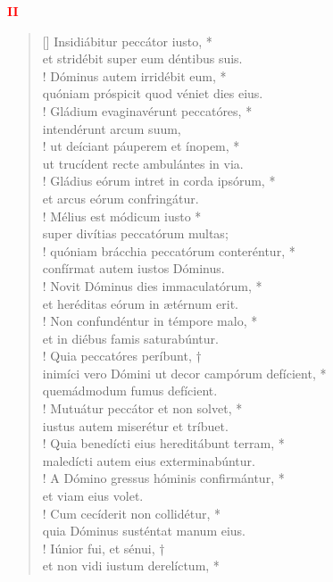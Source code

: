 \begin{center}
\textcolor{red}{\bf II}
\end{center}
\begin{verse}[\versewidth]
Insidiábitur peccátor iusto, *\\
et stridébit super eum déntibus suis.\\!
\vin Dóminus autem irridébit eum, *\\
\vin quóniam próspicit quod véniet dies eius.\\!
Gládium evaginavérunt peccatóres, *\\
intendérunt arcum suum,\\!
\vin ut deíciant páuperem et ínopem, *\\
\vin ut trucídent recte ambulántes in via.\\!
Gládius eórum intret in corda ipsórum, *\\
et arcus eórum confringátur.\\!
\vin Mélius est módicum iusto *\\
\vin super divítias peccatórum multas;\\!
quóniam brácchia peccatórum conteréntur, *\\
confírmat autem iustos Dóminus.\\!
\vin Novit Dóminus dies immaculatórum, *\\
\vin et heréditas eórum in ætérnum erit.\\!
Non confundéntur in témpore malo, *\\
et in diébus famis saturabúntur.\\!
\vin Quia peccatóres períbunt, †\\
\vin inimíci vero Dómini ut decor campórum defícient, *\\
quemádmodum fumus defícient.\\!
\vin Mutuátur peccátor et non solvet, *\\
\vin iustus autem miserétur et tríbuet.\\!
Quia benedícti eius hereditábunt terram, *\\
maledícti autem eius exterminabúntur.\\!
\vin A Dómino gressus hóminis confirmántur, *\\
\vin et viam eius volet.\\!
Cum cecíderit non collidétur, *\\
quia Dóminus susténtat manum eius.\\!
\vin Iúnior fui, et sénui, †\\
\vin et non vidi iustum derelíctum, *\\

\end{verse}
